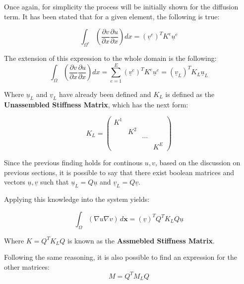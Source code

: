 \documentclass[
  a4paper,
  10pt]{article}
\begin{document}
Once again, for simplicity the process will be initially shown for the
diffusion term. It has been stated that for a given element, the
following is true:

\begin{equation}
\int_{\Omega^{e}} ( \frac{\partial v}{\partial x}\frac{\partial u}{\partial x})dx =(\underline{v}^{e})^{T}K^{e}\underline{u}^{e}
\end{equation}

The extension of this expression to the whole domain is the following:
\begin{equation}
    \int_{\Omega} ( \frac{\partial v}{\partial x}\frac{\partial u}{\partial x})dx = \sum_{e=1}^{E} (\underline{v}^{e})^{T}K^{e}\underline{u}^{e} = (\underline{v}_L)^{T}K_L\underline{u}_L    
\end{equation}

Where \(\underline{u}_L\) and \(\underline{v}_L\) have already been
defined and \(K_L\) is defined as the \textbf{Unassembled Stiffness
Matrix}, which has the next form:

\begin{equation}
        K_L=
        \begin{pmatrix}
        K^1 &           &        & \\
                  & K^2 &        & \\
                  &           & \cdots & \\
                  &           &        & K^{E}
        \end{pmatrix} 
\end{equation}

Since the previous finding holds for continous \(u,v\), based on the
discussion on previous sections, it is possible to say that there exist
boolean matrices and vectors \(\underline{u}, \underline{v}\) such that
\(\underline{u}_L=Q\underline{u}\) and
\(\underline{v}_L=Q\underline{v}\).

Applying this knowledge into the system yields:

\begin{equation}
        \int_{\Omega} (\nabla u \nabla v) \,d\textbf{x} = (\underline{v})^{T}Q^{T}K_LQ\underline{u}    
\end{equation}

Where \(K=Q^{T}K_LQ\) is known as the \textbf{Assmebled Stiffness
Matrix}.

Following the same reasoning, it is also possible to find an expression
for the other matrices: \begin{equation}
M = Q^{T}M_LQ    
\end{equation}
\end{document}
